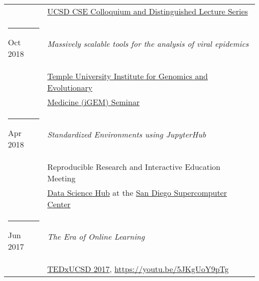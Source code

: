 \documentclass[margin,line]{res}
\begin{document}
\begin{resume}
\begin{longtable}{@{}p{0.7in}p{4in}}
\hspace*{-4mm} & \hspace{4mm} \href{https://cse.ucsd.edu/about/cse-colloquium-dls/2018-2019}{UCSD CSE Colloquium and Distinguished Lecture Series}\\
\hspace*{-4mm} \rule{-1mm}{5mm} Oct 2018 & \textit{Massively scalable tools for the analysis of viral epidemics}\\*
\hspace*{-4mm} & \hspace{4mm} \href{http://igem.temple.edu/home}{Temple University Institute for Genomics and Evolutionary}\\*
\hspace*{-4mm} & \hspace{4mm} \href{http://igem.temple.edu/home}{Medicine (iGEM) Seminar}\\
\hspace*{-4mm} \rule{-1mm}{5mm} Apr 2018 & \textit{Standardized Environments using JupyterHub}\\*
\hspace*{-4mm} & \hspace{4mm} Reproducible Research and Interactive Education Meeting\\*
\hspace*{-4mm} & \hspace{4mm} \href{https://datascience.sdsc.edu/}{Data Science Hub} at the \href{https://www.sdsc.edu/}{San Diego Supercomputer Center}\\
\hspace*{-4mm} \rule{-1mm}{5mm} Jun 2017 & \textit{The Era of Online Learning}\\*
\hspace*{-4mm} & \hspace{4mm} \href{https://www.ted.com/tedx/events/22004}{TEDxUCSD 2017}, \href{https://youtu.be/5JKgUoY9pTg}{https://youtu.be/5JKgUoY9pTg}\\
\end{longtable}


\end{resume}
\end{document}
